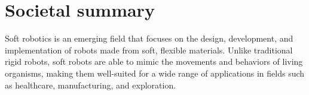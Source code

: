 \chapter*{Societal summary}






Soft robotics is an emerging field that focuses on the design, development, and implementation of robots made from soft, flexible materials. Unlike traditional rigid robots, soft robots are able to mimic the movements and behaviors of living organisms, making them well-suited for a wide range of applications in fields such as healthcare, manufacturing, and exploration.

